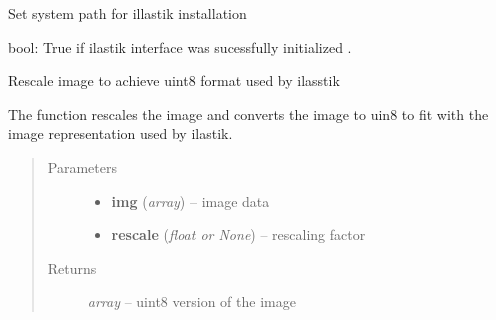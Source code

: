 \documentclass[letterpaper,10pt,english]{sphinxmanual}
\begin{document}
\begin{fulllineitems}
\label{api/ClearMap.ImageProcessing:ClearMap.ImageProcessing.IlastikClassification.initializeIlastik}
Set system path for illastik installation

\end{fulllineitems}


\begin{fulllineitems}
\label{api/ClearMap.ImageProcessing:ClearMap.ImageProcessing.IlastikClassification.Initialized}
bool: True if ilastik interface was sucessfully initialized .

\end{fulllineitems}


\begin{fulllineitems}
\label{api/ClearMap.ImageProcessing:ClearMap.ImageProcessing.IlastikClassification.rescaleToIlastik}
Rescale image to achieve uint8 format used by ilasstik

The function rescales the image and converts the image to uin8
to fit with the image representation used by ilastik.
\begin{quote}\begin{description}
\item[{Parameters}] \leavevmode\begin{itemize}
\item {} 
\textbf{img} (\emph{array}) --
image data

\item {} 
\textbf{rescale} (\emph{float or None}) --
rescaling factor

\end{itemize}

\item[{Returns}] \leavevmode
\emph{array} --
uint8 version of the image

\end{description}\end{quote}

\end{fulllineitems}
\end{document}
